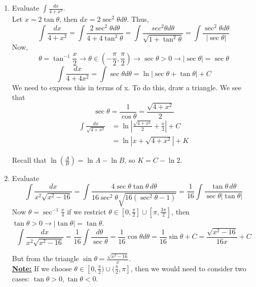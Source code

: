 \documentclass[11pt]{article}
\theoremstyle{plain}
\theoremstyle{remark}
\theoremstyle{plain}
\newcommand{\bd}{\textbf}
\begin{document}
\begin{tcolorbox}[colback=magenta!5!white,colframe=magenta!75!black,title=Example]
   \begin{enumerate}
       \item Evaluate $\int\frac{dx}{4+x^2}$. \\
       
       Let $x=2\tan\theta$, then $dx=2\sec^2\theta d\theta$. Thus,
       \[\int\frac{dx}{4+x^2}=\int\frac{2\sec^2\theta d\theta}{4+4\tan^2\theta}=
       \int\frac{sec^2\theta d\theta}{\sqrt{1+\tan^2\theta}}=\int\frac{\sec^2\theta d\theta}{|\sec\theta|}\]
       Now, \[\theta=\tan^{-1}\frac{x}{2}\rightarrow \theta\in(-\frac{\pi}{2},\frac{\pi}{2})\rightarrow \sec\theta>0\rightarrow |\sec\theta|=\sec\theta\]
       \[\int\frac{dx}{4+4x^2}=\int\sec\theta d\theta = \ln|\sec\theta+\tan\theta|+C\]
       We need to express this in terms of x. To do this, draw a triangle. We see that \[\sec\theta = \frac{1}{\cos\theta}=\frac{\sqrt{4+x^2}}{2}\]
       \begin{align*}
           \int\frac{dx}{\sqrt{4+x^2}}&=\ln |\frac{\sqrt{4+x^2}}{2}+\frac{x}{2}|+C\\
           &=\ln |x+\sqrt{4+x^2}|+K
       \end{align*}

       Recall that $\ln(\frac{A}{B})=\ln A-\ln B$, so $K=C-\ln 2$.
       \item Evaluate \[\int\frac{dx}{x^2\sqrt{x^2-16}}=\int\frac{4\sec\theta\tan\theta\,d\theta}{16\sec^2\theta\sqrt{16(\sec^2\theta-1)}}=\frac{1}{16}\int\frac{\tan\theta\,d\theta}{\sec\theta|\tan\theta|}\]
       Now $\theta=\sec^{-1}\frac{x}{4}$ if we restrict $\theta\in[0,\frac{\pi}{2}]\cup[\pi,\frac{3\pi}{2}]$, then $\tan\theta>0\rightarrow |\tan\theta|=\tan\theta$.
       \[\int\frac{dx}{x^2\sqrt{x^2-16}}=\frac{1}{16}\int\frac{d\theta}{\sec\theta}=\frac{1}{16}\cos\theta d\theta =\frac{1}{16}\sin\theta +C=\frac{\sqrt{x^2-16}}{16x}+C\]

       But from the triangle $\sin\theta=\frac{\sqrt{x^2-16}}{x}$. \\

       \underline{\bd{Note:}} If we choose $\theta\in[0,\frac{\pi}{2})\cup (\frac{\pi}{2},\pi]$, then we would need 
       to consider two cases: $\tan\theta>0,\tan\theta<0$.
   \end{enumerate}
\end{tcolorbox}   
\end{document}
